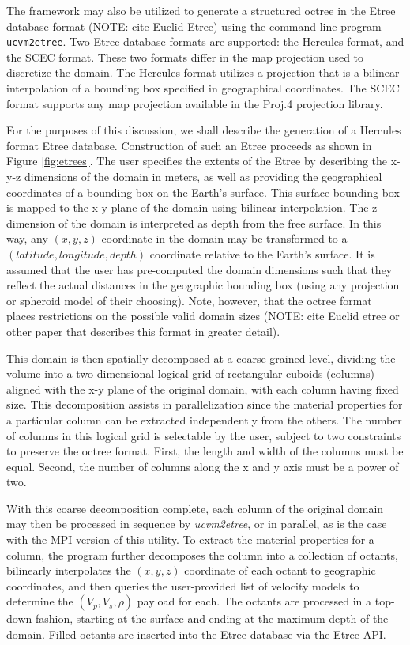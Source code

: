 The framework may also be utilized to generate a structured octree in the Etree database format (NOTE: cite Euclid Etree) using the command-line program \texttt{ucvm2etree}. Two Etree database formats are supported: the Hercules format, and the SCEC format. These two formats differ in the map projection used to discretize the domain. The Hercules format utilizes a projection that is a bilinear interpolation of a bounding box specified in geographical coordinates. The SCEC format supports any map projection available in the Proj.4 projection library.

For the purposes of this discussion, we shall describe the generation of a Hercules format Etree database. Construction of such an Etree proceeds as shown in Figure \ref{fig:etrees}. The user specifies the extents of the Etree by describing the x-y-z dimensions of the domain in meters, as well as providing the geographical coordinates of a bounding box on the Earth's surface. This surface bounding box is mapped to the x-y plane of the domain using bilinear interpolation. The z dimension of the domain is interpreted as depth from the free surface. In this way, any $(x,y,z)$ coordinate in the domain may be transformed to a $(latitude, longitude, depth)$ coordinate relative to the Earth's surface. It is assumed that the user has pre-computed the domain dimensions such that they reflect the actual distances in the geographic bounding box (using any projection or spheroid model of their choosing). Note, however, that the octree format places restrictions on the possible valid domain sizes (NOTE: cite Euclid etree or other paper that describes this format in greater detail).

This domain is then spatially decomposed at a coarse-grained level, dividing the volume into a two-dimensional logical grid of rectangular cuboids (columns) aligned with the x-y plane of the original domain, with each column having fixed size. This decomposition assists in parallelization since the material properties for a particular column can be extracted independently from the others. The number of columns in this logical grid is selectable by the user, subject to two constraints to preserve the octree format. First, the length and width of the columns must be equal. Second, the number of columns along the x and y axis must be a power of two.

With this coarse decomposition complete, each column of the original domain may then be processed in sequence by \emph{ucvm2etree}, or in parallel, as is the case with the MPI version of this utility. To extract the material properties for a column, the program further decomposes the column into a collection of octants, bilinearly interpolates the $(x,y,z)$ coordinate of each octant to geographic coordinates, and then queries the user-provided list of velocity models to determine the $(V_p, V_s, \rho)$ payload for each. The octants are processed in a top-down fashion, starting at the surface and ending at the maximum depth of the domain. Filled octants are inserted into the Etree database via the Etree API.

